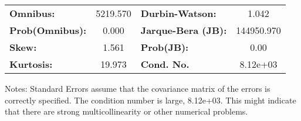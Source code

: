 \begin{table}[H]
  \centering
  \begin{tabular}{lclc}
    \toprule
    \textbf{Omnibus:}       & 5219.570 & \textbf{  Durbin-Watson:     } & 1.042      \\
    \textbf{Prob(Omnibus):} & 0.000    & \textbf{  Jarque-Bera (JB):  } & 144950.970 \\
    \textbf{Skew:}          & 1.561    & \textbf{  Prob(JB):          } & 0.00       \\
    \textbf{Kurtosis:}      & 19.973   & \textbf{  Cond. No.          } & 8.12e+03   \\
    \bottomrule
  \end{tabular}
\end{table}

Notes: \newline
[1] Standard Errors assume that the covariance matrix of the errors is correctly specified. \newline
[2] The condition number is large, 8.12e+03. This might indicate that there are \newline
strong multicollinearity or other numerical problems.
